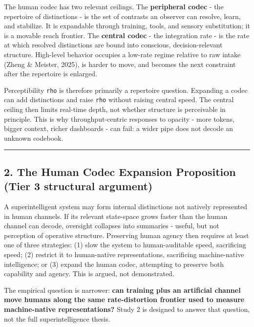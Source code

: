 \documentclass[
  11pt,
]{article}
\begin{document}
The human codec has two relevant ceilings. The
\textbf{peripheral codec} - the repertoire of
distinctions - is the set of contrasts an observer can
resolve, learn, and stabilize. It is expandable through
training, tools, and sensory substitution; it is a
movable reach frontier. The \textbf{central codec} -
the integration rate - is the rate at which resolved
distinctions are bound into conscious,
decision-relevant structure. High-level behavior
occupies a low-rate regime relative to raw intake
(Zheng \& Meister, 2025), is harder to move, and
becomes the next constraint after the repertoire is
enlarged.

Perceptibility \texttt{rho} is therefore primarily a
repertoire question. Expanding a codec can add
distinctions and raise \texttt{rho} without raising
central speed. The central ceiling then limits
real-time depth, not whether structure is perceivable
in principle. This is why throughput-centric responses
to opacity - more tokens, bigger context, richer
dashboards - can fail: a wider pipe does not decode an
unknown codebook.

\begin{center}\rule{0.5\linewidth}{0.5pt}\end{center}

\subsection{2. The Human Codec Expansion Proposition
(Tier 3 structural
argument)}\label{the-human-codec-expansion-proposition-tier-3-structural-argument}

A superintelligent system may form internal
distinctions not natively represented in human
channels. If its relevant state-space grows faster than
the human channel can decode, oversight collapses into
summaries - useful, but not perception of operative
structure. Preserving human agency then requires at
least one of three strategies: (1) slow the system to
human-auditable speed, sacrificing speed; (2) restrict
it to human-native representations, sacrificing
machine-native intelligence; or (3) expand the human
codec, attempting to preserve both capability and
agency. This is argued, not demonstrated.

The empirical question is narrower: \textbf{can
training plus an artificial channel move humans along
the same rate-distortion frontier used to measure
machine-native representations?} Study 2 is designed to
answer that question, not the full superintelligence
thesis.
\end{document}
